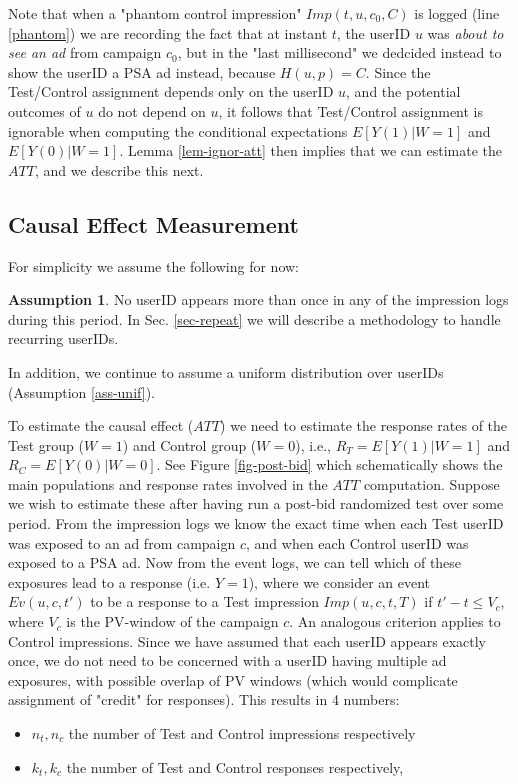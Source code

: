 \documentclass[11pt,a4paper]{article}
\theoremstyle{definition}
\theoremstyle{remark}
\theoremstyle{definition}
\theoremstyle{definition}
\theoremstyle{definition}
\theoremstyle{definition}
\theoremstyle{definition}
\theoremstyle{definition}
\newtheorem{assumption}{Assumption
}[section]
\begin{document}
Note that when a "phantom control impression" $Imp(t, u, c_0, C)$ is logged (line \ref{phantom}) we are recording the fact that at instant $t$, the userID $u$ was {\em about to see an ad} from campaign $c_0$, but in the "last millisecond" we dedcided instead to show the userID a PSA ad instead, because $H(u,p) = C$. Since the Test/Control assignment depends only on the userID $u$, and the potential outcomes of $u$ do not depend on $u$, it follows that Test/Control assignment is ignorable when computing the conditional expectations $E[Y(1) | W=1]$ and $E[Y(0) | W=1]$. Lemma \ref{lem-ignor-att} then implies that we can estimate the $ATT$, and we describe this next.

\subsection{Causal Effect Measurement}\label{sub-causal-post-bid}

For simplicity we assume the following for now:
\begin{assumption} \label{assum-user-once}
	No userID appears more than once in any of the impression logs during this period. In Sec. \ref{sec-repeat} we will describe a methodology to handle recurring userIDs.
\end{assumption}

In addition, we continue to assume a uniform distribution over userIDs (Assumption \ref{ass-unif}).



To estimate the causal effect ($ATT$) we need to estimate the response rates of the Test group ($W=1$) and Control group ($W=0$), i.e., 
$R_T = E[Y(1) | W=1]$ and $R_C = E[Y(0)|W=0]$. 
See Figure \ref{fig-post-bid} which schematically shows the main populations and response rates involved in the $ATT$ computation.
Suppose we wish to estimate these after having run a post-bid randomized test over some period. From the impression logs we know the exact time when each Test userID was exposed to an ad from campaign $c$, and 
when each Control userID was exposed to a PSA ad. Now from the event logs, we can tell which of these exposures lead to a response (i.e. $Y=1$), where we consider an event $Ev(u,c,t')$ to be a response to a Test impression $Imp(u,c,t,T)$ if $t'-t \leq V_c$, where $V_c$ is the PV-window of the campaign $c$. An analogous criterion applies to Control impressions. Since we have assumed that each userID appears exactly once, we do not need to be concerned with a userID having multiple ad exposures, with possible overlap of PV windows (which would complicate assignment of "credit" for responses). This results in 4 numbers: 
\begin{itemize}
	\item $n_t, n_c$ the number of Test and Control impressions respectively
	\item $k_t, k_c$ the number of Test and Control responses respectively,
\end{itemize}
\end{document}
